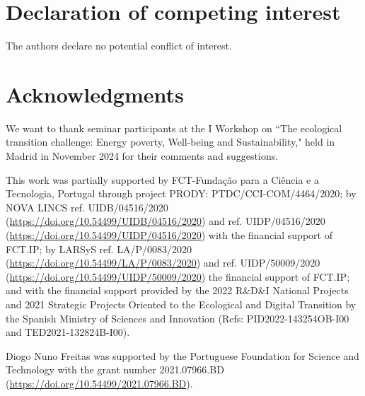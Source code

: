 \documentclass[preprint,authoryear,12pt]{elsarticle}
\begin{document}
\section*{Declaration of competing interest}

The authors declare no potential conflict of interest.

\section*{Acknowledgments}

We want to thank seminar participants at the I Workshop on ``The ecological transition challenge: Energy poverty, Well-being and Sustainability," held in Madrid in November 2024 for their comments and suggestions.

This work was partially supported by FCT-Fundação para a Ciência e a Tecnologia, Portugal through project PRODY: PTDC/CCI-COM/4464/2020; by NOVA LINCS ref. UIDB/04516/2020 (\href{https://doi.org/10.54499/UIDB/04516/2020}{https://doi.org/10.54499/UIDB/04516/2020}) and ref. UIDP/04516/2020 (\href{https://doi.org/10.54499/UIDP/04516/2020}{https://doi.org/10.54499/UIDP/04516/2020}) with the financial support of FCT.IP; by  LARSyS ref. LA/P/0083/2020 (\href{https://doi.org/10.54499/LA/P/0083/2020}{https://doi.org/10.54499/LA/P/0083/2020}) and ref. UIDP/50009/2020 (\href{https://doi.org/10.54499/UIDP/50009/2020}{https://doi.org/10.54499/UIDP/50009/2020}) the financial support of FCT.IP; and  with the financial support provided by the 2022 R\&D\&I National Projects and 2021 Strategic Projects Oriented to the Ecological and Digital Transition by the Spanish Ministry of Sciences and Innovation (Refs: PID2022-143254OB-I00 and TED2021-132824B-I00).

Diogo Nuno Freitas was supported by the Portuguese Foundation for Science and Technology with the grant number 2021.07966.BD 
(\href{https://doi.org/10.54499/2021.07966.BD}{https://doi.org/10.54499/2021.07966.BD}).
\end{document}
